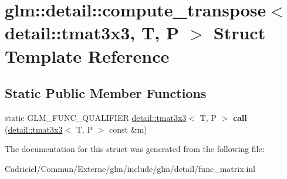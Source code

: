 \hypertarget{structglm_1_1detail_1_1compute__transpose_3_01detail_1_1tmat3x3_00_01_t_00_01_p_01_4}{}\section{glm\+:\+:detail\+:\+:compute\+\_\+transpose$<$ detail\+:\+:tmat3x3, T, P $>$ Struct Template Reference}
\label{structglm_1_1detail_1_1compute__transpose_3_01detail_1_1tmat3x3_00_01_t_00_01_p_01_4}
\subsection*{Static Public Member Functions}
\begin{DoxyCompactItemize}
\item 
static G\+L\+M\+\_\+\+F\+U\+N\+C\+\_\+\+Q\+U\+A\+L\+I\+F\+I\+ER \hyperlink{structglm_1_1detail_1_1tmat3x3}{detail\+::tmat3x3}$<$ T, P $>$ {\bfseries call} (\hyperlink{structglm_1_1detail_1_1tmat3x3}{detail\+::tmat3x3}$<$ T, P $>$ const \&m)\hypertarget{structglm_1_1detail_1_1compute__transpose_3_01detail_1_1tmat3x3_00_01_t_00_01_p_01_4_aeb6e3f561dc927d220808c5267b65149}{}\label{structglm_1_1detail_1_1compute__transpose_3_01detail_1_1tmat3x3_00_01_t_00_01_p_01_4_aeb6e3f561dc927d220808c5267b65149}

\end{DoxyCompactItemize}


The documentation for this struct was generated from the following file\+:\begin{DoxyCompactItemize}
\item 
Cadriciel/\+Commun/\+Externe/glm/include/glm/detail/func\+\_\+matrix.\+inl\end{DoxyCompactItemize}

